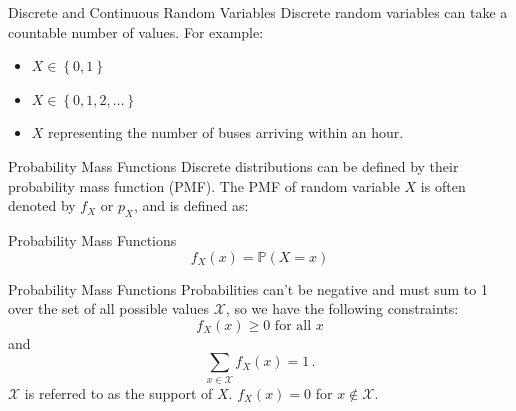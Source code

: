 \documentclass[10pt]{beamer}
\begin{document}
\begin{frame}[fragile]{Discrete and Continuous Random Variables}
Discrete random variables can take a countable number of values. For example:
\begin{itemize}
    \item \(X \in \left\{0, 1\right\}\)
    \item \(X \in \left\{0, 1, 2, \dots\right\}\)
    \item \(X\) representing the number of buses arriving within an hour.
\end{itemize}

\end{frame}

\begin{frame}[fragile]{Probability Mass Functions}
Discrete distributions can be defined by their probability mass function (PMF). The PMF of random variable \(X\) is often denoted by \(f_X\) or \(p_X\), and is defined as:
\begin{alertblock}{Probability Mass Functions}
\begin{equation*}
    f_X\left(x\right) = \mathbb{P}\left(X = x\right)
\end{equation*}
\end{alertblock}
\end{frame}

\begin{frame}[fragile]{Probability Mass Functions}
Probabilities can't be negative and must sum to 1 over the set of all possible values \(\mathcal{X}\), so we have the following constraints:
\begin{equation*}
    f_X\left(x\right) \geq 0 \text{ for all } x
\end{equation*}
and
\begin{equation*}
    \sum_{x \in \mathcal{X}} f_X\left(x\right) = 1\,.
\end{equation*}
\(\mathcal{X}\) is referred to as the support of \(X\). \(f_X\left(x\right) = 0\) for \(x \notin \mathcal{X}\).
\end{frame}
\end{document}
